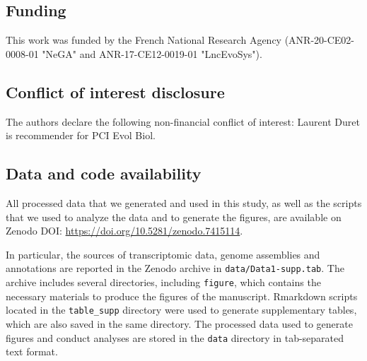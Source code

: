 \subsection*{Funding}
This work was funded by the French National Research Agency (ANR-20-CE02-0008-01 "NeGA" and ANR-17-CE12-0019-01 "LncEvoSys").

\subsection*{Conflict of interest disclosure}
The authors declare the following non-financial conflict of interest: Laurent Duret is recommender for PCI Evol Biol.

\subsection*{Data and code availability}
\label{sec:DataAndCodeAvailability}
All processed data that we generated and used in this study, as well as the scripts that we used to analyze the data and to generate the figures, are available on Zenodo DOI: \url{https://doi.org/10.5281/zenodo.7415114}. 

In particular, the sources of transcriptomic data, genome assemblies and annotations are reported in the Zenodo archive in \verb|data/Data1-supp.tab|. The archive includes several directories, including \verb|figure|, which contains the necessary materials to produce the figures of the manuscript. Rmarkdown scripts located in the \verb|table_supp| directory were used to generate supplementary tables, which are also saved in the same directory. The processed data used to generate figures and conduct analyses are stored in the \verb|data| directory in tab-separated text format.

